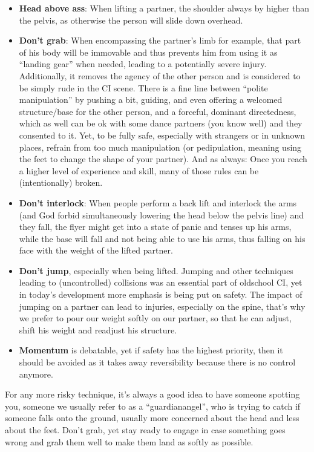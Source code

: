 \begin{itemize}
    \item \textbf{Head above ass}: When lifting a partner, the shoulder always by higher than the pelvis, as otherwise the person will slide down overhead.
    \item \textbf{Don't grab}: When encompassing the partner's limb for example, that part of his body will be immovable and thus prevents him from using it as ``landing gear'' when needed, leading to a potentially severe injury.
    Additionally, it removes the agency of the other person and is considered to be simply rude in the CI scene.
    There is a fine line between ``polite manipulation'' by pushing a bit, guiding, and even offering a welcomed structure/base for the other person, and a forceful, dominant directedness, which as well can be ok with some dance partners (you know well) and they consented to it.
    Yet, to be fully safe, especially with strangers or in unknown places, refrain from too much manipulation (or pedipulation, meaning using the feet to change the shape of your partner).
    And as always: Once you reach a higher level of experience and skill, many of those rules can be (intentionally) broken.
    \item \textbf{Don't interlock}: When people perform a back lift and interlock the arms (and God forbid simultaneously lowering the head below the pelvis line) and they fall, the flyer might get into a state of panic and tenses up his arms, while the base will fall and not being able to use his arms, thus falling on his face with the weight of the lifted partner.
    \item \textbf{Don't jump}, especially when being lifted.
    Jumping and other techniques leading to (uncontrolled) collisions was an essential part of oldschool CI, yet in today's development more emphasis is being put on safety.
    The impact of jumping on a partner can lead to injuries, especially on the spine, that's why we prefer to pour our weight softly on our partner, so that he can adjust, shift his weight and readjust his structure.
    \item \textbf{Momentum} is debatable, yet if safety has the highest priority, then it should be avoided as it takes away reversibility because there is no control anymore.
\end{itemize}

For any more risky technique, it's always a good idea to have someone spotting you, someone we usually refer to as a ``\gls{guardianangel}'', who is trying to catch if someone falls onto the ground, usually more concerned about the head and less about the feet.
Don't grab, yet stay ready to engage in case something goes wrong and grab them well to make them land as softly as possible.

